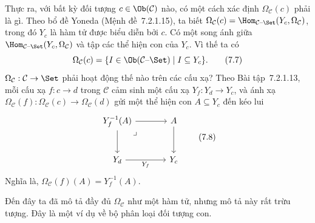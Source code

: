 Thực ra, với bất kỳ đối tượng $c\in\Ob(\mathcal C)$ nào, có một cách xác định $\Omega_{\mathcal C}(c)$ phải là gì. Theo bổ đề Yoneda (Mệnh đề~7.2.1.15), ta biết $\Omega_{\mathcal C}(c)=\Hom_{\mathcal C\text{--}\Set}(Y_c,\Omega_{\mathcal C})$, trong đó $Y_c$ là hàm tử được biểu diễn bởi $c$. Có một song ánh giữa $\Hom_{\mathcal C\text{--}\Set}(Y_c,\Omega_{\mathcal C})$ và tập các thể hiện con của $Y_c$. Vì thế ta có
\begin{equation}
\Omega_{\mathcal C}(c)=\{I\in\Ob(\mathcal C\text{--}\Set)\mid I\subseteq Y_c\}.\tag{7.7}
\end{equation}
$\Omega_{\mathcal C}:\mathcal C\to\Set$ phải hoạt động thế nào trên các cấu xạ? Theo Bài tập~7.2.1.13, mỗi cấu xạ $f:c\to d$ trong $\mathcal C$ cảm sinh một cấu xạ $Y_f:Y_d\to Y_c$, và ánh xạ $\Omega_{\mathcal C}(f):\Omega_{\mathcal C}(c)\to\Omega_{\mathcal C}(d)$ gửi một thể hiện con $A\subseteq Y_c$ đến kéo lui
\begin{equation}
\begin{tikzcd}[column sep=large,row sep=large]
Y_f^{-1}(A)\arrow[r]\arrow[d]\arrow[dr,phantom,"\lrcorner",very near start]&A\arrow[d]\\
Y_d\arrow[r,"Y_f"']&Y_c
\end{tikzcd}\tag{7.8}
\end{equation}
Nghĩa là, $\Omega_{\mathcal C}(f)(A)=Y_f^{-1}(A)$.

Đến đây ta đã mô tả đầy đủ $\Omega_{\mathcal C}$ như một hàm tử, nhưng mô tả này rất trừu tượng. Đây là một ví dụ về bộ phân loại đối tượng con.

